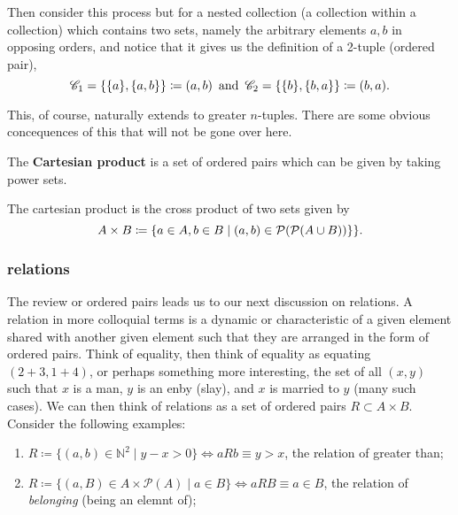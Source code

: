 \documentclass[12pt,oneside]{report}
\begin{document}
Then consider this process but for a nested collection (a collection within a collection) which contains two sets, namely the arbitrary elements \( a,b \) in opposing orders, and notice that it gives us the definition of a 2-tuple (ordered pair),
\[
  {\mathscr{C}}_{1} = \{\{a\} ,\{a,b\}   \} \coloneqq (a,b) \, \text{ and }\, {\mathscr{C}}_{2}  = \{\{b\} ,\{b,a\}   \} \coloneqq  (b,a)  
.\] 

This, of course, naturally extends to greater \( n \)-tuples. There are some obvious concequences of this that will not be gone over here. 

The \textbf{Cartesian product} is a set of ordered pairs which can be given by taking power sets. 

\begin{definition}
  The cartesian product is the cross product of two sets given by 
\[ A \times  B \coloneqq  \{a \in A, b \in B \mid  (a,b) \in  \mathcal{P}(\mathcal{P}(A \cup B))  \}  \}   .\]
\end{definition}

\subsubsection{relations}

The review or ordered pairs leads us to our next discussion on relations. A relation in more colloquial terms is a dynamic or characteristic of a given element shared with another given element such that they are arranged in the form of ordered pairs. Think of equality, then think of equality as equating \( (2+3,1+4) \), or perhaps something more interesting, the set of all \( (x,y) \) such that \( x \) is a man, \( y \) is an enby (slay), and \( x \) is married to \( y \) (many such cases). We can then think of relations as a set of ordered pairs \( R \subset A\times B \). Consider the following examples:
\begin{enumerate}
  \item \( R \coloneqq \{(a,b)\in \mathbb{N}^2 \mid y-x>0\} \iff aRb  \equiv y>x \), the relation of greater than;
  \item \( R\coloneqq \{ (a,B) \in A \times \mathcal{P}(A) \mid a \in B\} \iff aRB \equiv a \in B   \), the relation of \textit{belonging} (being an elemnt of);
\end{enumerate}
\end{document}
